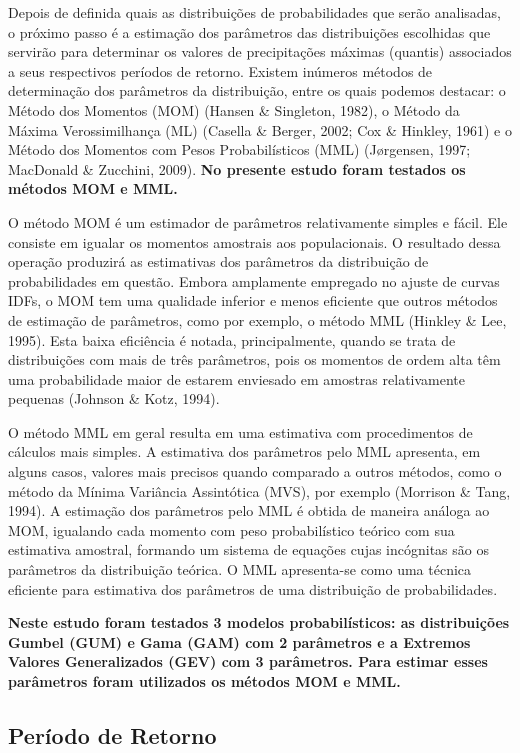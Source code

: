\documentclass[
]{agujournal2019}
\begin{document}
Depois de definida quais as distribuições de probabilidades que serão
analisadas, o próximo passo é a estimação dos parâmetros das
distribuições escolhidas que servirão para determinar os valores de
precipitações máximas (quantis) associados a seus respectivos períodos
de retorno. Existem inúmeros métodos de determinação dos parâmetros da
distribuição, entre os quais podemos destacar: o Método dos Momentos
(MOM) (Hansen \& Singleton, 1982), o Método da Máxima Verossimilhança
(ML) (Casella \& Berger, 2002; Cox \& Hinkley, 1961) e o Método dos
Momentos com Pesos Probabilísticos (MML) (Jørgensen, 1997; MacDonald \&
Zucchini, 2009). \textbf{No presente estudo foram testados os métodos
MOM e MML.}

O método MOM é um estimador de parâmetros relativamente simples e fácil.
Ele consiste em igualar os momentos amostrais aos populacionais. O
resultado dessa operação produzirá as estimativas dos parâmetros da
distribuição de probabilidades em questão. Embora amplamente empregado
no ajuste de curvas IDFs, o MOM tem uma qualidade inferior e menos
eficiente que outros métodos de estimação de parâmetros, como por
exemplo, o método MML (Hinkley \& Lee, 1995). Esta baixa eficiência é
notada, principalmente, quando se trata de distribuições com mais de
três parâmetros, pois os momentos de ordem alta têm uma probabilidade
maior de estarem enviesado em amostras relativamente pequenas (Johnson
\& Kotz, 1994).

O método MML em geral resulta em uma estimativa com procedimentos de
cálculos mais simples. A estimativa dos parâmetros pelo MML apresenta,
em alguns casos, valores mais precisos quando comparado a outros
métodos, como o método da Mínima Variância Assintótica (MVS), por
exemplo (Morrison \& Tang, 1994). A estimação dos parâmetros pelo MML é
obtida de maneira análoga ao MOM, igualando cada momento com peso
probabilístico teórico com sua estimativa amostral, formando um sistema
de equações cujas incógnitas são os parâmetros da distribuição teórica.
O MML apresenta-se como uma técnica eficiente para estimativa dos
parâmetros de uma distribuição de probabilidades.

\textbf{Neste estudo foram testados 3 modelos probabilísticos: as
distribuições Gumbel (GUM) e Gama (GAM) com 2 parâmetros e a Extremos
Valores Generalizados (GEV) com 3 parâmetros. Para estimar esses
parâmetros foram utilizados os métodos MOM e MML.}

\subsection{Período de Retorno}\label{peruxedodo-de-retorno}
\end{document}
